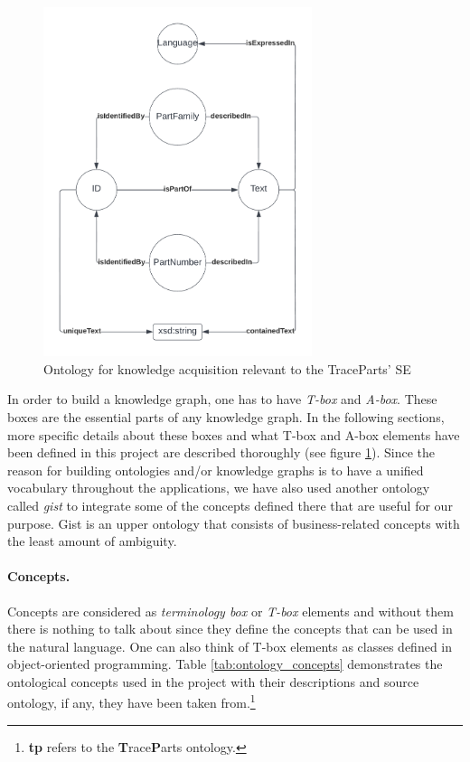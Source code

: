 \begin{figure}[ht]
	\centering
	\includegraphics[width=0.70\textwidth]{../../resources/responding_se_onto.png}
	\caption{Ontology for knowledge acquisition relevant to the TraceParts' SE}
	\label{fig:ontology}
\end{figure}

In order to build a knowledge graph, one has to have \textit{T-box} and \textit{A-box}. These boxes are 
the essential parts of any knowledge graph. In the following sections, more specific details about 
these boxes and what T-box and A-box elements have been defined in this project are described 
thoroughly (see figure \ref{fig:ontology}). Since 
the reason for building ontologies and/or knowledge graphs is to have a unified vocabulary throughout 
the 
applications, we have also used another ontology called \textit{gist} \cite{gist} to integrate some of 
the concepts defined there that are useful for our purpose. Gist is an upper ontology that consists of 
business-related concepts with the least amount of ambiguity.

\paragraph{Concepts.}
Concepts are considered as \textit{terminology box} or \textit{T-box} elements and without them 
there is nothing to talk about since they define the concepts that can be used in the natural language. 
One can also think of T-box elements as classes defined in object-oriented programming. Table \ref{tab:ontology_concepts} demonstrates the ontological concepts used in the project with their descriptions and 
source ontology, if any, they have been taken from.\footnote{\textbf{tp} refers to the 
\textbf{T}race\textbf{P}arts ontology.}

